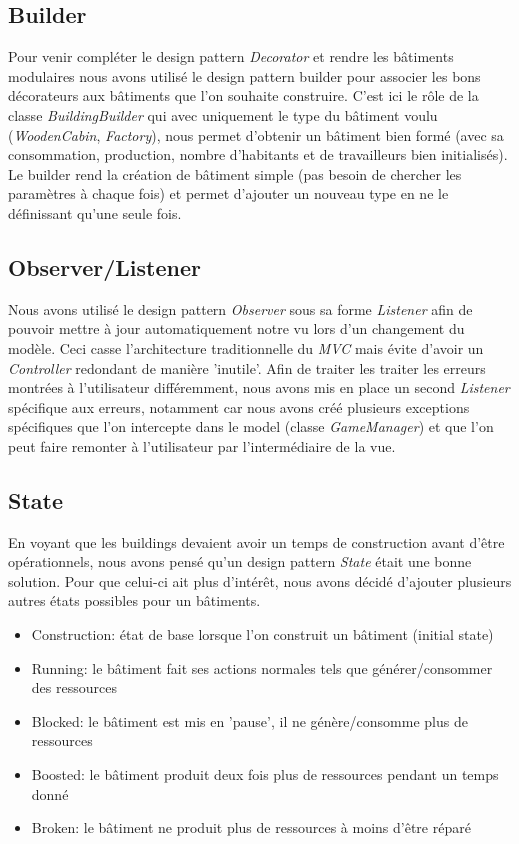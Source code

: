 \documentclass{article}
\begin{document}
\subsection{Builder}
Pour venir compléter le design pattern \textit{Decorator} et rendre les bâtiments modulaires nous avons utilisé le design
pattern builder pour associer les bons décorateurs aux bâtiments que l'on souhaite construire. C'est ici le rôle de la
classe \textit{BuildingBuilder} qui avec uniquement le type du bâtiment voulu (\textit{WoodenCabin}, \textit{Factory}), 
nous permet d'obtenir un bâtiment bien formé (avec sa consommation, production, nombre d'habitants et de travailleurs bien 
initialisés). Le builder rend la création de bâtiment simple (pas besoin de chercher les paramètres à chaque fois) et permet 
d'ajouter un nouveau type en ne le définissant qu'une seule fois.

\subsection{Observer/Listener}
Nous avons utilisé le design pattern \textit{Observer} sous sa forme \textit{Listener} afin de pouvoir mettre à jour automatiquement
notre vu lors d'un changement du modèle. Ceci casse l'architecture traditionnelle du \textit{MVC} mais évite d'avoir un \textit{Controller}
redondant de manière 'inutile'. Afin de traiter les traiter les erreurs montrées à l'utilisateur différemment, nous avons mis en place
un second \textit{Listener} spécifique aux erreurs, notamment car nous avons créé plusieurs exceptions spécifiques que l'on intercepte
dans le model (classe \textit{GameManager}) et que l'on peut faire remonter à l'utilisateur par l'intermédiaire de la vue.

\subsection{State}
En voyant que les buildings devaient avoir un temps de construction avant d'être opérationnels, nous avons pensé qu'un design pattern
\textit{State} était une bonne solution. Pour que celui-ci ait plus d'intérêt, nous avons décidé d'ajouter plusieurs autres états possibles
pour un bâtiments.
\begin{itemize}
    \item Construction: état de base lorsque l'on construit un bâtiment (initial state)
    \item Running: le bâtiment fait ses actions normales tels que générer/consommer des ressources
    \item Blocked: le bâtiment est mis en 'pause', il ne génère/consomme plus de ressources
    \item Boosted: le bâtiment produit deux fois plus de ressources pendant un temps donné
    \item Broken: le bâtiment ne produit plus de ressources à moins d'être réparé
\end{itemize}
\end{document}
